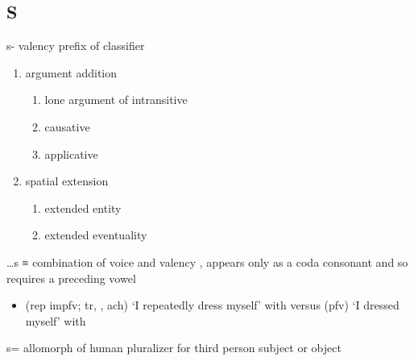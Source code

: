 \subsection{S}\label{sec:alphalist-s}
\begin{morphdesc}[resume*=alphalist]
\item[s-]\label{m:s-}
	valency prefix of classifier
	\begin{enumerate}
	\item	argument addition
		\begin{enumerate}
		\item	lone argument of intransitive
		\item	causative
		\item	applicative
		\end{enumerate}
	\item	spatial extension
		\begin{enumerate}
		\item	extended entity
		\item	extended eventuality
		\end{enumerate}
	\end{enumerate}

\item[…s]\label{m:…s}
	≡ 
	combination of voice 
		and valency ,
	appears only as a coda consonant and so requires a preceding vowel
	\begin{itemize}
	\item	{} (rep impfv; tr, , ach) ‘I repeatedly dress myself’
			with \newline
		versus  (pfv) ‘I dressed myself’
			with 
	\end{itemize}

\item[s=]
	allomorph of human pluralizer  for third person subject or object


\end{morphdesc}
